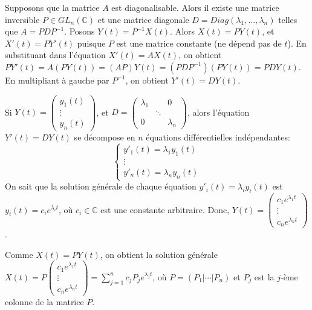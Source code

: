 \documentclass{article}
\begin{document}
Supposons que la matrice $A$ est diagonalisable. Alors il existe une matrice inversible $P \in GL_n(\mathbb{C})$ et une matrice diagonale $D = Diag(\lambda_1, \ldots, \lambda_n)$ telles que $A = PDP^{-1}$.
Posons $Y(t) = P^{-1} X(t)$. Alors $X(t) = P Y(t)$, et $X'(t) = P Y'(t)$ puisque $P$ est une matrice constante (ne dépend pas de $t$). En substituant dans l'équation $X'(t) = A X(t)$, on obtient $P Y'(t) = A (P Y(t)) = (AP) Y(t) = (PDP^{-1}) (P Y(t)) = PD Y(t)$.
En multipliant à gauche par $P^{-1}$, on obtient $Y'(t) = D Y(t)$.

Si $Y(t) = \begin{pmatrix} y_1(t) \\ \vdots \\ y_n(t) \end{pmatrix}$, et $D = \begin{pmatrix} \lambda_1 & & 0 \\ & \ddots & \\ 0 & & \lambda_n \end{pmatrix}$, alors l'équation $Y'(t) = D Y(t)$ se décompose en $n$ équations différentielles indépendantes:
\begin{equation*}
\begin{cases}
y'_1(t) = \lambda_1 y_1(t) \\
\vdots \\
y'_n(t) = \lambda_n y_n(t)
\end{cases}
\end{equation*}
On sait que la solution générale de chaque équation $y'_i(t) = \lambda_i y_i(t)$ est $y_i(t) = c_i e^{\lambda_i t}$, où $c_i \in \mathbb{C}$ est une constante arbitraire. Donc, $Y(t) = \begin{pmatrix} c_1 e^{\lambda_1 t} \\ \vdots \\ c_n e^{\lambda_n t} \end{pmatrix}$.

Comme $X(t) = P Y(t)$, on obtient la solution générale $X(t) = P \begin{pmatrix} c_1 e^{\lambda_1 t} \\ \vdots \\ c_n e^{\lambda_n t} \end{pmatrix} = \sum_{j=1}^n c_j P_j e^{\lambda_j t}$, où $P = (P_1 | \cdots | P_n)$ et $P_j$ est la $j$-ème colonne de la matrice $P$.
\end{document}
